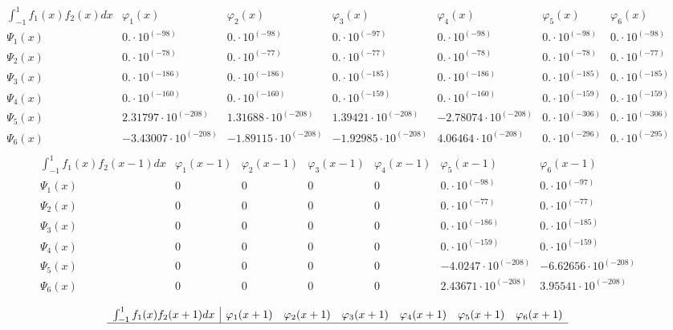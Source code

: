 \documentclass{article}
\begin{document}
\begin{landscape}
$$\begin{array}{l|llllll}
\end{array} $$ 
$$ \begin{array}{l|llllll}
\int_{-1}^1 f_1(x)f_2(x) dx& \varphi_1(x)& \varphi_2(x)& \varphi_3(x)& \varphi_4(x)& \varphi_5(x)& \varphi_6(x) \\ \hline 
 \Psi_1(x) & 0.\cdot 10^{(-98)} & 0.\cdot 10^{(-98)} & 0.\cdot 10^{(-97)} & 0.\cdot 10^{(-98)} & 0.\cdot 10^{(-98)} & 0.\cdot 10^{(-98)} \\ 
\Psi_2(x) & 0.\cdot 10^{(-78)} & 0.\cdot 10^{(-77)} & 0.\cdot 10^{(-77)} & 0.\cdot 10^{(-78)} & 0.\cdot 10^{(-78)} & 0.\cdot 10^{(-77)} \\ 
\Psi_3(x) & 0.\cdot 10^{(-186)} & 0.\cdot 10^{(-186)} & 0.\cdot 10^{(-185)} & 0.\cdot 10^{(-186)} & 0.\cdot 10^{(-185)} & 0.\cdot 10^{(-185)} \\ 
\Psi_4(x) & 0.\cdot 10^{(-160)} & 0.\cdot 10^{(-160)} & 0.\cdot 10^{(-159)} & 0.\cdot 10^{(-160)} & 0.\cdot 10^{(-159)} & 0.\cdot 10^{(-159)} \\ 
\Psi_5(x) & 2.31797\cdot 10^{(-208)} & 1.31688\cdot 10^{(-208)} & 1.39421\cdot 10^{(-208)} & -2.78074\cdot 10^{(-208)} & 0.\cdot 10^{(-306)} & 0.\cdot 10^{(-306)} \\ 
\Psi_6(x) & -3.43007\cdot 10^{(-208)} & -1.89115\cdot 10^{(-208)} & -1.92985\cdot 10^{(-208)} & 4.06464\cdot 10^{(-208)} & 0.\cdot 10^{(-296)} & 0.\cdot 10^{(-295)} \\ 
\end{array} $$ 
$$ \begin{array}{l|llllll}
\int_{-1}^1 f_1(x)f_2(x-1) dx& \varphi_1(x-1)& \varphi_2(x-1)& \varphi_3(x-1)& \varphi_4(x-1)& \varphi_5(x-1)& \varphi_6(x-1) \\ \hline 
 \Psi_1(x) & 0 & 0 & 0 & 0 & 0.\cdot 10^{(-98)} & 0.\cdot 10^{(-97)} \\ 
\Psi_2(x) & 0 & 0 & 0 & 0 & 0.\cdot 10^{(-77)} & 0.\cdot 10^{(-77)} \\ 
\Psi_3(x) & 0 & 0 & 0 & 0 & 0.\cdot 10^{(-186)} & 0.\cdot 10^{(-185)} \\ 
\Psi_4(x) & 0 & 0 & 0 & 0 & 0.\cdot 10^{(-159)} & 0.\cdot 10^{(-159)} \\ 
\Psi_5(x) & 0 & 0 & 0 & 0 & -4.0247\cdot 10^{(-208)} & -6.62656\cdot 10^{(-208)} \\ 
\Psi_6(x) & 0 & 0 & 0 & 0 & 2.43671\cdot 10^{(-208)} & 3.95541\cdot 10^{(-208)} \\ 
\end{array} $$ 
$$ \begin{array}{l|llllll}
\int_{-1}^1 f_1(x)f_2(x+1) dx& \varphi_1(x+1)& \varphi_2(x+1)& \varphi_3(x+1)& \varphi_4(x+1)& \varphi_5(x+1)& \varphi_6(x+1) \\ \hline 

\end{array}$$
\end{landscape}
\end{document}
